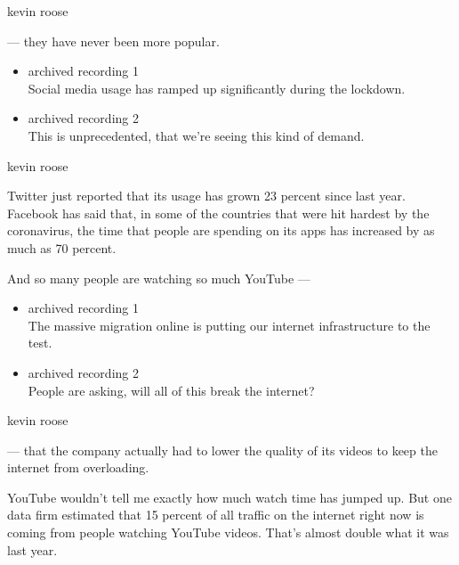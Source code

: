 kevin roose

--- they have never been more popular.

\begin{itemize}
\item
  archived recording 1\\
  Social media usage has ramped up significantly during the lockdown.
\item
  archived recording 2\\
  This is unprecedented, that we're seeing this kind of demand.
\end{itemize}

kevin roose

Twitter just reported that its usage has grown 23 percent since last
year. Facebook has said that, in some of the countries that were hit
hardest by the coronavirus, the time that people are spending on its
apps has increased by as much as 70 percent.

And so many people are watching so much YouTube ---

\begin{itemize}
\item
  archived recording 1\\
  The massive migration online is putting our internet infrastructure to
  the test.
\item
  archived recording 2\\
  People are asking, will all of this break the internet?
\end{itemize}

kevin roose

--- that the company actually had to lower the quality of its videos to
keep the internet from overloading.

YouTube wouldn't tell me exactly how much watch time has jumped up. But
one data firm estimated that 15 percent of all traffic on the internet
right now is coming from people watching YouTube videos. That's almost
double what it was last year.

